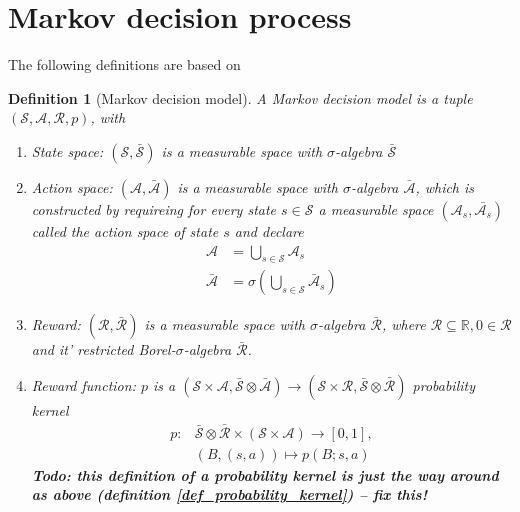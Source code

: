 \documentclass[10pt,a4paper]{article}
\newtheorem{definition}{Definition}
\begin{document}
\section{Markov decision process}

The following definitions are based on \cite{doringrf}
\begin{definition}[Markov decision model]
A Markov decision model is a tuple $(\mathcal S, \mathcal A, \mathcal R, p)$, with 
\begin{enumerate}
	\item 
		State space: $(\mathcal S , \bar{\mathcal S}) $ is a measurable space with $\sigma$-algebra $\bar{\mathcal S}$
	\item 
	Action space: $(\mathcal A , \bar{\mathcal A}) $ is a measurable space with $\sigma$-algebra $\bar{\mathcal A}$, which is constructed by requireing  for every state $s \in \mathcal S$ a measurable space  $(\mathcal A_s , \bar{\mathcal A_s}) $  called the action space of state $s$ and declare 
	\begin{align*}
	\mathcal A &= \bigcup_{s\in \mathcal S} \mathcal A_s \\ 
	\bar{\mathcal A} &= \sigma \left( \bigcup_{s\in \mathcal S} \bar{\mathcal A}_s \right)
	\end{align*}
	\item 
	Reward: $(\mathcal R , \bar{\mathcal R}) $ is a measurable space with $\sigma$-algebra  $\bar{\mathcal R} $, where $\mathcal R \subseteq  \mathbb R, 0 \in \mathcal R$ and it' restricted Borel-$\sigma$-algebra $\bar{\mathcal R}$.
	\item
	Reward function: $p$ is a  $(\mathcal S \times \mathcal A, \bar{\mathcal S} \otimes \bar{\mathcal A} ) \rightarrow (\mathcal S \times \mathcal R,  \bar{\mathcal S} \otimes \bar{\mathcal R})$ probability kernel
	\begin{align*}
		 p:  &\bar{\mathcal S} \otimes \bar{\mathcal R}   \times  (\mathcal S \times \mathcal A) \rightarrow [0,1], \\
		 &(B, (s, a) )   \mapsto p(B; s, a )
	\end{align*}
\textbf{	Todo: this definition of a probability kernel is just the way around as above (definition \ref{def_probability_kernel}) -- fix this!}
\end{enumerate}
\end{definition}
\end{document}

